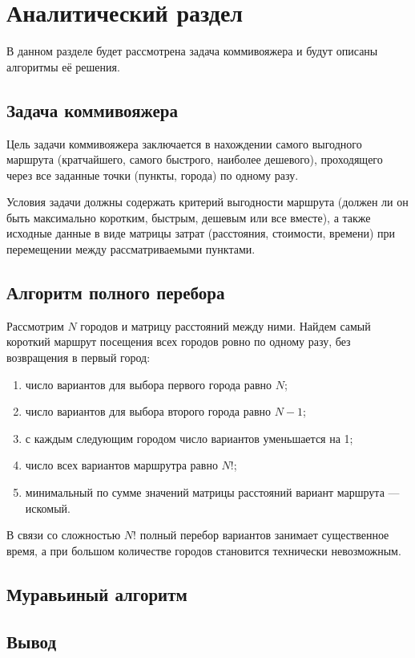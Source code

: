 \chapter{Аналитический раздел}

В данном разделе будет рассмотрена задача коммивояжера и будут описаны алгоритмы её решения.

\section{Задача коммивояжера}

Цель задачи коммивояжера \cite{info_tsp} заключается в нахождении самого выгодного маршрута (кратчайшего, самого быстрого, наиболее дешевого), проходящего через все заданные точки (пункты, города) по одному разу.

Условия задачи должны содержать критерий выгодности маршрута (должен ли он быть максимально коротким, быстрым, дешевым или все вместе), а также исходные данные в виде матрицы затрат (расстояния, стоимости, времени) при перемещении между рассматриваемыми пунктами.

\section{Алгоритм полного перебора}

Рассмотрим $N$ городов и матрицу расстояний между ними. 
Найдем самый короткий маршрут посещения всех городов ровно по одному разу, без возвращения в первый город:

\begin{enumerate}[label={\arabic*)}]
	\item число вариантов для выбора первого города равно $N$;
	\item число вариантов для выбора второго города равно $N-1$;
	\item с каждым следующим городом число вариантов уменьшается на 1;
	\item число всех вариантов маршрутра равно $N!$;
	\item минимальный по сумме значений матрицы расстояний вариант маршрута --- искомый.
\end{enumerate}

В связи со сложностью $N!$ полный перебор вариантов занимает существенное время, а при большом количестве городов становится технически невозможным.

\section{Муравьиный алгоритм}

\section*{Вывод}

